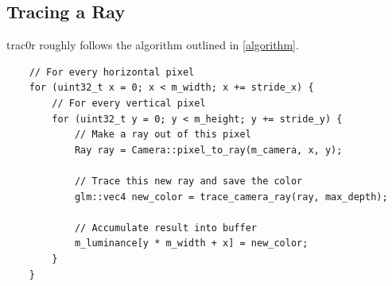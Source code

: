 \documentclass[
  twoside,
  11pt, a4paper,
  footinclude=true,
  headinclude=true,
  cleardoublepage=empty
]{scrreprt}
\begin{document}
\subsection{Tracing a Ray}
trac0r roughly follows the algorithm outlined in \ref{algorithm}.

\begin{verbatim}
    // For every horizontal pixel
    for (uint32_t x = 0; x < m_width; x += stride_x) {
        // For every vertical pixel
        for (uint32_t y = 0; y < m_height; y += stride_y) {
            // Make a ray out of this pixel
            Ray ray = Camera::pixel_to_ray(m_camera, x, y);

            // Trace this new ray and save the color
            glm::vec4 new_color = trace_camera_ray(ray, max_depth);

            // Accumulate result into buffer
            m_luminance[y * m_width + x] = new_color;
        }
    }
\end{verbatim} 
\begingroup
{}
\endgroup
\end{document}
